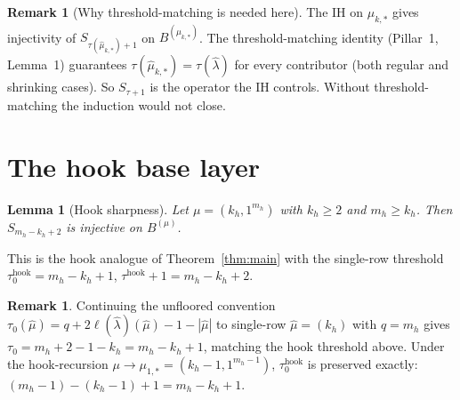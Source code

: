 \documentclass[11pt]{article}
\newtheorem{lemma}[theorem]{Lemma}
\theoremstyle{definition}
\newtheorem{remark}[theorem]{Remark}
\newcommand{\hatl}{\widehat\lambda}
\newcommand{\hatm}{\widehat\mu}
\newcommand{\elh}{\ell(\hatl)}
\begin{document}
\begin{remark}[Why threshold-matching is needed here]\label{rem:tau-match}
The IH on $\mu_{k,*}$ gives injectivity of $S_{\tau(\hat\mu_{k,*})+1}$
on $B^{(\mu_{k,*})}$. The threshold-matching identity
(Pillar~1, Lemma~1) guarantees $\tau(\hat\mu_{k,*}) = \tau(\hatl)$ for
every contributor (both regular and shrinking cases). So
$S_{\tau+1}$ is the operator the IH controls. Without
threshold-matching the induction would not close.
\end{remark}

\section{The hook base layer}\label{sec:hook}

\begin{lemma}[Hook sharpness]\label{lem:hook-sharp}
Let $\mu = (k_h, 1^{m_h})$ with $k_h \ge 2$ and $m_h \ge k_h$. Then
$S_{m_h - k_h + 2}$ is injective on $B^{(\mu)}$.
\end{lemma}

\noindent
This is the hook analogue of Theorem~\ref{thm:main} with the
single-row threshold $\tau^{\mathrm{hook}}_0 = m_h - k_h + 1$,
$\tau^{\mathrm{hook}} + 1 = m_h - k_h + 2$.

\begin{remark}\label{rem:hook-tau-match}
Continuing the unfloored convention $\tau_0(\hatm) = q + 2\elh(\hatm)
- 1 - |\hatm|$ to single-row $\hatm = (k_h)$ with $q = m_h$ gives
$\tau_0 = m_h + 2 - 1 - k_h = m_h - k_h + 1$, matching the hook
threshold above. Under the hook-recursion $\mu \to \mu_{1,*} = (k_h-1,
1^{m_h - 1})$, $\tau^{\mathrm{hook}}_0$ is preserved exactly:
$(m_h-1) - (k_h-1) + 1 = m_h - k_h + 1$.
\end{remark}
\end{document}

